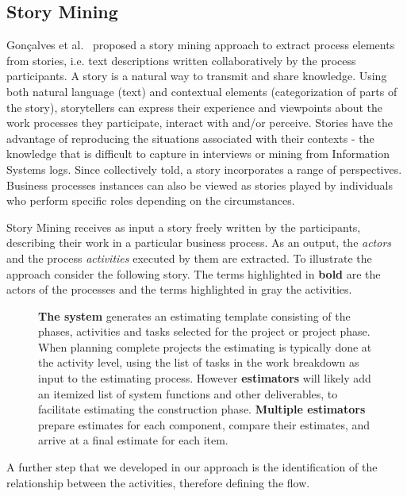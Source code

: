 \subsection{Story Mining}
\label{subsec:story-mining}

Gon\c{c}alves et al.~\cite{Goncalves2011} proposed a story mining approach to extract process elements from stories, i.e. text descriptions written collaboratively by the process participants. A story is a natural way to transmit and share knowledge. Using both natural language (text) and contextual elements (categorization of parts of the story), storytellers can express their experience and viewpoints about the work processes they participate, interact with and/or perceive. Stories have the advantage of reproducing the situations associated with their contexts - the knowledge that is difficult to capture in interviews or mining from Information Systems logs. Since collectively told, a story incorporates a range of perspectives. Business processes instances can also be viewed as stories played by individuals who perform specific roles depending on the circumstances.

Story Mining  \cite{Goncalves2011} receives as input a story freely written by the participants, describing their work in a particular business process. As an output, the \emph{actors} and the process \emph{activities} executed by them are extracted. To illustrate the approach consider the following story. The terms highlighted in {\bf bold} are the actors of the processes and the terms highlighted in {\color{gray} gray} the activities. 

\begin{figure}[!h]
{ \bf The system} {\color{gray} generates an estimating template consisting of the phases, activities and tasks} selected
for the project or project phase. When planning complete projects the estimating is typically done at the activity level, using the
list of tasks in the work breakdown as input to the estimating process. However {\bf estimators} will likely {\color{gray}add an itemized list of system functions and other deliverables}, to facilitate estimating the construction phase. {\bf Multiple estimators} {\color{gray} prepare estimates for each component}, {\color{gray}compare their estimates}, and {\color{gray}arrive at a final estimate} for each item.
  \label{RB}
\end{figure}

A further step that we developed in our approach is the identification of the relationship between the activities, therefore defining the flow.